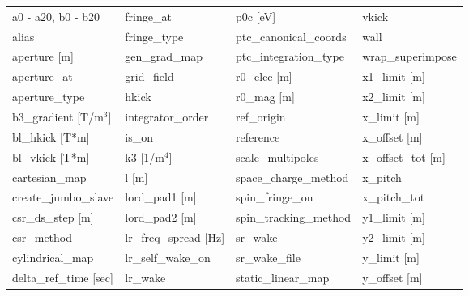  \begin{tabular}{llll} \toprule
a0 - a20, b0 - b20               & fringe_at                        & p0c [eV]                         & vkick                            \\
alias                            & fringe_type                      & ptc_canonical_coords             & wall                             \\
aperture [m]                     & gen_grad_map                     & ptc_integration_type             & wrap_superimpose                 \\
aperture_at                      & grid_field                       & r0_elec [m]                      & x1_limit [m]                     \\
aperture_type                    & hkick                            & r0_mag [m]                       & x2_limit [m]                     \\
b3_gradient [T/m$^3$]            & integrator_order                 & ref_origin                       & x_limit [m]                      \\
bl_hkick [T*m]                   & is_on                            & reference                        & x_offset [m]                     \\
bl_vkick [T*m]                   & k3 [1/m$^4$]                     & scale_multipoles                 & x_offset_tot [m]                 \\
cartesian_map                    & l [m]                            & space_charge_method              & x_pitch                          \\
create_jumbo_slave               & lord_pad1 [m]                    & spin_fringe_on                   & x_pitch_tot                      \\
csr_ds_step [m]                  & lord_pad2 [m]                    & spin_tracking_method             & y1_limit [m]                     \\
csr_method                       & lr_freq_spread [Hz]              & sr_wake                          & y2_limit [m]                     \\
cylindrical_map                  & lr_self_wake_on                  & sr_wake_file                     & y_limit [m]                      \\
delta_ref_time [sec]             & lr_wake                          & static_linear_map                & y_offset [m]                     \\

\end{tabular}
